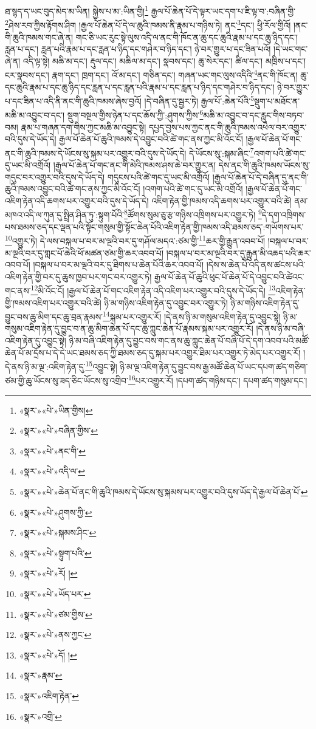 ཐ་སྙད་ད་ཡང་བུད་མེད་མ་ཡིན། སྐྱེས་པ་མ་:ཡིན་གྱི།\footnote{«སྣར་»«པེ་»ཡིན་གྱིས།} རྒྱལ་པོ་ཆེན་པོ་དེ་ལྟར་ཡང་དག་པ་ཇི་ལྟ་བ་:བཞིན་གྱི་\footnote{«སྣར་»«པེ་»བཞིན་གྱིས་}ཤེས་རབ་ཀྱིས་རྟོགས་ཤིག །རྒྱལ་པོ་ཆེན་པོ་དེ་ལ་ཆུའི་ཁམས་ནི་རྣམ་པ་གཉིས་ཏེ། ནང་\footnote{«སྣར་»«པེ་»ནང་གི་}དང་། ཕྱི་རོལ་གྱིའོ། །ནང་གི་ཆུའི་ཁམས་གང་ཞེ་ན། གང་ཅི་ཡང་རུང་སྟེ་ལུས་འདི་ལ་ནང་གི་ཁོང་ན་ཆུ་དང་ཆུའི་རྣམ་པ་དང་ཆུ་ཉིད་དང་། རླན་པ་དང་། རླན་པའི་རྣམ་པ་དང་རླན་པ་ཉིད་དང་གཤེར་བ་ཉིད་དང་། ཉེ་བར་གྱུར་པ་དང་ཟིན་པའོ། །དེ་ཡང་གང་ཞེ་ན། འདི་ལྟ་སྟེ། མཆི་མ་དང་། རྡུལ་དང་། མཆིལ་མ་དང་། སྣབས་དང་། ཆུ་སེར་དང་། ཚིལ་དང་། མཁྲིས་པ་དང་། ངར་སྣབས་དང་། རྣག་དང་། ཁྲག་དང་། འོ་མ་དང་། གཅིན་དང་། གཞན་ཡང་གང་ལུས་འདིའི་\footnote{«སྣར་»«པེ་»འདི་ལ་}ནང་གི་ཁོང་ན། ཆུ་དང་ཆུའི་རྣམ་པ་དང་ཆུ་ཉིད་དང་རླན་པ་དང་རླན་པའི་རྣམ་པ་དང་རླན་པ་ཉིད་དང་གཤེར་བ་ཉིད་དང་། ཉེ་བར་གྱུར་པ་དང་ཟིན་པ་འདི་ནི་ནང་གི་ཆུའི་ཁམས་ཞེས་བྱའོ། །དེ་བཞིན་དུ་སྦྱར་ཏེ། རྒྱལ་པོ་:ཆེན་པོའི་\footnote{«སྣར་»«པེ་»ཆེན་པོ་ནང་གི་ཆུའི་ཁམས་དེ་ཡོངས་སུ་སྐམས་པར་འགྱུར་བའི་དུས་ཡོད་དེ་རྒྱལ་པོ་ཆེན་པོ་}སྡུག་པ་མཐོང་ན་མཆི་མ་འབྱུང་བ་དང་། སྡུག་བསྔལ་གྱིས་ཉེན་པ་དང་ཆོས་ཀྱི་:ཤུགས་ཀྱིས་\footnote{«སྣར་»«པེ་»ཤུགས་ཀྱི་}མཆི་མ་འབྱུང་བ་དང་རླུང་གིས་བཏབ་བམ། རྣམ་པ་གཞན་དག་གིས་ཀྱང་མཆི་མ་འབྱུང་སྟེ། དཔྱད་བྱས་པས་ཀྱང་ནང་གི་ཆུའི་ཁམས་འཕེལ་བར་འགྱུར་བའི་དུས་དེ་ཡོད་དེ། རྒྱལ་པོ་ཆེན་པོ་ཆུའི་ཁམས་དེ་འབྱུང་བའི་ཚེ་གང་ནས་ཀྱང་མི་འོང་ངོ། །རྒྱལ་པོ་ཆེན་པོ་གང་ནང་གི་ཆུའི་ཁམས་དེ་ཡོངས་སུ་སྐམ་པར་འགྱུར་བའི་དུས་དེ་ཡོད་དེ། དེ་ཡོངས་སུ་:སྐམ་ཞིང་\footnote{«སྣར་»«པེ་»སྐམས་ཤིང་}འགག་པའི་ཚེ་གང་དུ་ཡང་མི་འགྲོའོ། །རྒྱལ་པོ་ཆེན་པོ་གང་ནང་གི་མེའི་ཁམས་ཤས་ཆེ་བར་གྱུར་ན། དེས་ནང་གི་ཆུའི་ཁམས་ཡོངས་སུ་གདུང་བར་འགྱུར་བའི་དུས་དེ་ཡོད་དེ། གདུངས་པའི་ཚེ་གང་དུ་ཡང་མི་འགྲོའོ། །རྒྱལ་པོ་ཆེན་པོ་དེ་བཞིན་དུ་ནང་གི་ཆུའི་ཁམས་འབྱུང་བའི་ཚེ་གང་ནས་ཀྱང་མི་འོང་ངོ། །འགག་པའི་ཚེ་གང་དུ་ཡང་མི་འགྲོའོ། །རྒྱལ་པོ་ཆེན་པོ་གང་འཇིག་རྟེན་འདི་ཆགས་པར་འགྱུར་བའི་དུས་དེ་ཡོད་དེ། འཇིག་རྟེན་གྱི་ཁམས་འདི་ཆགས་པར་འགྱུར་བའི་ཚེ། ནམ་མཁའ་འདི་ལ་ཀུན་དུ་སྤྲིན་ཤིན་ཏུ་:སྟུག་པོའི་\footnote{«སྣར་»«པེ་»སྟུག་པའི་}ཚོགས་སུམ་ཅུ་རྩ་གཉིས་འཁྲིགས་པར་འགྱུར་ཏེ། \footnote{«སྣར་»«པེ་»རོ། ། }དེ་དག་འཁྲིགས་པས་ཐམས་ཅད་དང་ལྡན་པའི་སྟོང་གསུམ་གྱི་སྟོང་ཆེན་པོའི་འཇིག་རྟེན་གྱི་ཁམས་འདི་ཐམས་ཅད་:གཡོགས་པར་\footnote{«སྣར་»«པེ་»ཡོད་པར་}འགྱུར་ཏེ། དེ་ལས་བསྐལ་པ་བར་མ་ལྔའི་བར་དུ་གཤོལ་མདའ་:ཙམ་གྱི་\footnote{«སྣར་»«པེ་»ཙམ་གྱིས་}ཆར་གྱི་རྒྱུན་འབབ་པོ། །བསྐལ་པ་བར་མ་ལྔའི་བར་དུ་གླང་པོ་ཆེའི་ཕོ་མཚན་ཙམ་གྱི་ཆར་འབབ་པོ། །བསྐལ་པ་བར་མ་ལྔའི་བར་དུ་རྒྱུན་མི་འཆད་པའི་ཆར་འབབ་པོ། །བསྐལ་པ་བར་མ་ལྔའི་བར་དུ་ཐིགས་པ་ཆེན་པོའི་ཆར་འབབ་པོ། །དེས་ས་ཆེན་པོ་འདི་ནས་ཚངས་པའི་འཇིག་རྟེན་གྱི་བར་དུ་ཆུས་ཁྱབ་པར་གང་བར་འགྱུར་ཏེ། རྒྱལ་པོ་ཆེན་པོ་ཆུའི་ཕུང་པོ་ཆེན་པོ་དེ་འབྱུང་བའི་ཚེའང་གང་ནས་\footnote{«སྣར་»«པེ་»ནས་ཀྱང་}མི་འོང་ངོ། །རྒྱལ་པོ་ཆེན་པོ་གང་འཇིག་རྟེན་འདི་འཇིག་པར་འགྱུར་བའི་དུས་དེ་ཡོད་དེ། \footnote{«སྣར་»«པེ་»དོ། ། }འཇིག་རྟེན་གྱི་ཁམས་འཇིག་པར་འགྱུར་བའི་ཚེ། ཉི་མ་གཉིས་འཇིག་རྟེན་དུ་འབྱུང་བར་འགྱུར་ཏེ། ཉི་མ་གཉིས་འཇིག་རྟེན་དུ་བྱུང་བས་ཆུ་མིག་དང་ཆུ་བྲན་རྣམས་\footnote{«སྣར་»རྣམ་}སྐམ་པར་འགྱུར་རོ། །དེ་ནས་ཉི་མ་གསུམ་འཇིག་རྟེན་དུ་འབྱུང་སྟེ། ཉི་མ་གསུམ་འཇིག་རྟེན་དུ་བྱུང་བ་ན་ཆུ་མིག་ཆེན་པོ་དང་ཆུ་ཀླུང་ཆེན་པོ་རྣམས་སྐམ་པར་འགྱུར་རོ། །དེ་ནས་ཉི་མ་བཞི་འཇིག་རྟེན་དུ་འབྱུང་སྟེ། ཉི་མ་བཞི་འཇིག་རྟེན་དུ་བྱུང་བས་གང་ནས་ཆུ་ཀླུང་ཆེན་པོ་བཞི་པོ་དེ་དག་འབབ་པའི་མཚོ་ཆེན་པོ་མ་དྲོས་པ་དེ་དེ་ཡང་ཐམས་ཅད་ཀྱི་ཐམས་ཅད་དུ་སྐམ་པར་འགྱུར་ཐིམ་པར་འགྱུར་ཏེ་མེད་པར་འགྱུར་རོ། །དེ་ནས་ཉི་མ་ལྔ་:འཇིག་རྟེན་དུ་\footnote{«སྣར་»འཇིག་རྟེན་}འབྱུང་སྟེ། ཉི་མ་ལྔ་འཇིག་རྟེན་དུ་བྱུང་བས་རྒྱ་མཚོ་ཆེན་པོ་ཡང་དཔག་ཚད་གཅིག་ཙམ་གྱི་ཆུ་ཡོངས་སུ་ཟད་ཅིང་ཡོངས་སུ་འགྲིབ་\footnote{«སྣར་»འགྲི་}པར་འགྱུར་རོ། །དཔག་ཚད་གཉིས་དང་། དཔག་ཚད་གསུམ་དང་། 